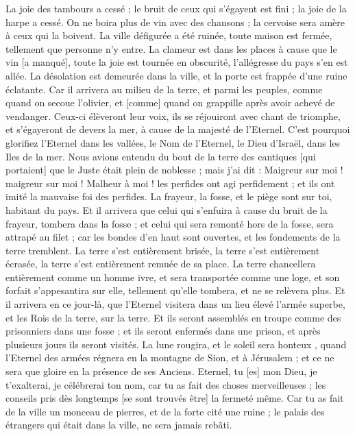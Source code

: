 \begin{multicols}{2}
La joie des tambours a cessé ; le bruit de ceux qui s'égayent est fini ; la joie de la harpe a cessé.
On ne boira plus de vin avec des chansons ; la cervoise sera amère à ceux qui la boivent.
La ville défigurée a été ruinée, toute maison est fermée, tellement que personne n'y entre.
La clameur est dans les places à cause que le vin [a manqué], toute la joie est tournée en obscurité, l'allégresse du pays s'en est allée.
La désolation est demeurée dans la ville, et la porte est frappée d'une ruine éclatante.
Car il arrivera au milieu de la terre, et parmi les peuples, comme quand on secoue l'olivier, et [comme] quand on grappille après avoir achevé de vendanger.
Ceux-ci élèveront leur voix, ils se réjouiront avec chant de triomphe, et s'égayeront de devers la mer, à cause de la majesté de l'Eternel.
C'est pourquoi glorifiez l'Eternel dans les vallées, le Nom de l'Eternel, le Dieu d'Israël, dans les Iles de la mer.
Nous avions entendu du bout de la terre des cantiques [qui portaient] que le Juste était plein de noblesse ; mais j'ai dit : Maigreur sur moi ! maigreur sur moi ! Malheur à moi ! les perfides ont agi perfidement ; et ils ont imité la mauvaise foi des perfides.
La frayeur, la fosse, et le piège sont sur toi, habitant du pays.
Et il arrivera que celui qui s'enfuira à cause du bruit de la frayeur, tombera dans la fosse ; et celui qui sera remonté hors de la fosse, sera attrapé au filet ; car les bondes d'en haut sont ouvertes, et les fondements de la terre tremblent.
La terre s'est entièrement brisée, la terre s'est entièrement écrasée, la terre s'est entièrement remuée de sa place.
La terre chancellera entièrement comme un homme ivre, et sera transportée comme une loge, et son forfait s'appesantira sur elle, tellement qu'elle tombera, et ne se relèvera plus.
Et il arrivera en ce jour-là, que l'Eternel visitera dans un lieu élevé l'armée superbe, et les Rois de la terre, sur la terre.
Et ils seront assemblés en troupe comme des prisonniers dans une fosse ; et ils seront enfermés dans une prison, et après plusieurs jours ils seront visités.
La lune rougira, et le soleil sera honteux , quand l'Eternel des armées régnera en la montagne de Sion, et à Jérusalem ; et ce ne sera que gloire en la présence de ses Anciens.
\VerseOne{}Eternel, tu [es] mon Dieu, je t'exalterai, je célébrerai ton nom, car tu as fait des choses merveilleuses ; les conseils pris dès longtemps [se sont trouvés être] la fermeté même.
Car tu as fait de la ville un monceau de pierres, et de la forte cité une ruine ; le palais des étrangers qui était dans la ville, ne sera jamais rebâti.

\end{multicols}
